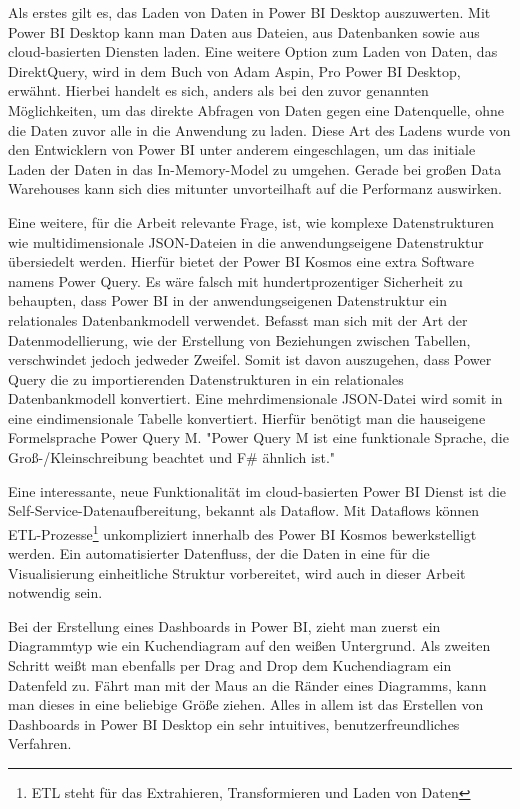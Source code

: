Als erstes gilt es, das Laden von Daten in Power BI Desktop auszuwerten. Mit Power BI Desktop kann man 
Daten aus Dateien, aus Datenbanken sowie aus cloud-basierten Diensten laden. Eine weitere Option zum Laden 
von Daten, das DirektQuery, wird in dem Buch von Adam Aspin, Pro Power BI Desktop, erwähnt. 
Hierbei handelt es sich, anders als bei den zuvor genannten Möglichkeiten, um das direkte
Abfragen von Daten gegen eine Datenquelle, ohne die Daten zuvor alle in die Anwendung zu laden.\cite[S. 111]{ProPowerBIDesktop}
Diese Art des Ladens wurde von den Entwicklern von Power BI unter anderem eingeschlagen,
um das initiale Laden der Daten in das In-Memory-Model zu umgehen. Gerade bei großen Data Warehouses
kann sich dies mitunter unvorteilhaft auf die Performanz auswirken.

Eine weitere, für die Arbeit relevante Frage, ist, wie komplexe Datenstrukturen wie multidimensionale JSON-Dateien
in die anwendungseigene Datenstruktur übersiedelt werden. Hierfür bietet der Power BI Kosmos eine extra Software
namens Power Query. Es wäre falsch mit hundertprozentiger Sicherheit zu behaupten, dass Power BI in der
anwendungseigenen Datenstruktur ein relationales Datenbankmodell verwendet. Befasst man sich mit der Art
der Datenmodellierung, wie der Erstellung von Beziehungen zwischen Tabellen, verschwindet jedoch jedweder Zweifel. \cite[S. 319]{ProPowerBIDesktop}
Somit ist davon auszugehen, dass Power Query die zu importierenden Datenstrukturen in ein relationales Datenbankmodell
konvertiert. Eine mehrdimensionale JSON-Datei wird somit in eine eindimensionale Tabelle konvertiert.
Hierfür benötigt man die hauseigene Formelsprache Power Query M. "Power Query M ist eine funktionale Sprache,
die Groß-/Kleinschreibung beachtet und F\# ähnlich ist."\cite{MicrosoftDocsPowerQueryFormelsprache}

Eine interessante, neue Funktionalität im cloud-basierten Power BI Dienst ist die Self-Service-Datenaufbereitung,
bekannt als Dataflow. Mit Dataflows können ETL-Prozesse\footnote{ETL steht für das Extrahieren, Transformieren und Laden von Daten}
unkompliziert innerhalb des Power BI Kosmos bewerkstelligt werden. Ein automatisierter Datenfluss,
der die Daten in eine für die Visualisierung einheitliche Struktur vorbereitet, wird auch in dieser
Arbeit notwendig sein.

Bei der Erstellung eines Dashboards in Power BI, zieht man zuerst ein Diagrammtyp wie ein Kuchendiagram
auf den weißen Untergrund. Als zweiten Schritt weißt man ebenfalls per Drag and Drop dem Kuchendiagram ein
Datenfeld zu. Fährt man mit der Maus an die Ränder eines Diagramms, kann man dieses in eine beliebige Größe
ziehen. Alles in allem ist das Erstellen von Dashboards in Power BI Desktop ein sehr intuitives,
benutzerfreundliches Verfahren.

